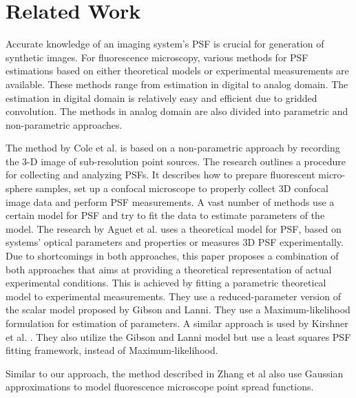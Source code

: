 %
\newpage
\chapter{Related Work}
Accurate knowledge of an imaging system’s PSF is crucial for generation of synthetic images. For fluorescence microscopy, various methods for PSF estimations based on either
theoretical models or experimental measurements are available. These methods range from estimation in digital to analog domain. The estimation in digital domain is relatively easy and efficient due to gridded convolution. The methods in analog domain are also divided into parametric and non-parametric approaches. \par
The method by Cole et al. \cite{cole} is based on a non-parametric approach by recording the 3-D image of sub-resolution point sources. The research outlines a procedure for collecting and analyzing PSFs. It describes how to prepare fluorescent micro-sphere samples, set up a confocal microscope to properly collect 3D confocal image data and perform PSF measurements.
A vast number of methods use a certain model for PSF and try to fit the data to estimate parameters of the model. 
The research by Aguet et al. \cite{aguet2008} uses a theoretical model for PSF, based on systems' optical parameters and properties or measures 3D PSF experimentally. Due to shortcomings in both approaches, this paper proposes a combination of both approaches that aims at providing a theoretical representation of actual experimental conditions. This is achieved by fitting a parametric theoretical model to experimental measurements. They use a
reduced-parameter version of the scalar model proposed by Gibson and Lanni. They use a Maximum-likelihood formulation for estimation of parameters. A similar approach is used by Kirshner et al. \cite{kishner}. They also utilize the Gibson and Lanni model but use a least squares PSF fitting framework, instead of Maximum-likelihood. \par
Similar to our approach, the method described in Zhang et al \cite{gauss} also use Gaussian approximations to model fluorescence microscope point spread functions.